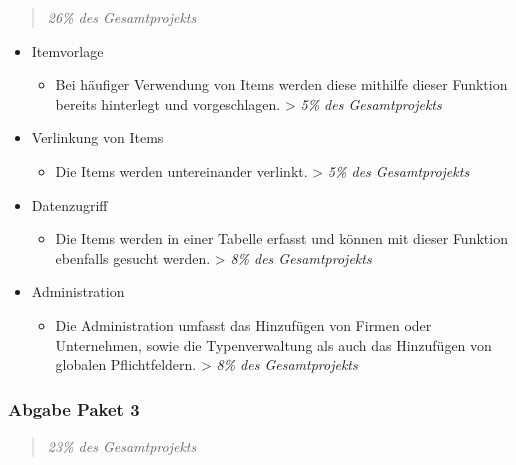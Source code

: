 \begin{quote}
\emph{26\% des Gesamtprojekts}
\end{quote}

\begin{itemize}
\itemsep1pt\parskip0pt
\item
  Itemvorlage

  \begin{itemize}
  \itemsep1pt\parskip0pt
  \item
    Bei häufiger Verwendung von Items werden diese mithilfe dieser Funktion bereits hinterlegt
    und vorgeschlagen. \textgreater{} \emph{5\% des
    Gesamtprojekts}
  \end{itemize}
\item
  Verlinkung von Items

  \begin{itemize}
  \itemsep1pt\parskip0pt
  \item
    Die Items werden untereinander verlinkt. \textgreater{} \emph{5\%
    des Gesamtprojekts}
  \end{itemize}
\item
  Datenzugriff

  \begin{itemize}
  \itemsep1pt\parskip0pt
  \item
    Die Items werden in einer Tabelle erfasst und können mit dieser Funktion ebenfalls
    gesucht werden. \textgreater{} \emph{8\% des
    Gesamtprojekts}
  \end{itemize}
\item
  Administration

  \begin{itemize}
  \itemsep1pt\parskip0pt
  \item
    Die Administration umfasst das Hinzufügen von Firmen oder
    Unternehmen, sowie die Typenverwaltung als auch das Hinzufügen von
    globalen Pflichtfeldern. \textgreater{} \emph{8\% des
    Gesamtprojekts}
  \end{itemize}
\end{itemize}

\subsubsection{Abgabe Paket 3}\label{abgabe-paket-3}

\begin{quote}
\emph{23\% des Gesamtprojekts}
\end{quote}

